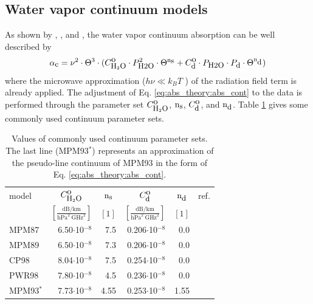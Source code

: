 \subsection{Water vapor continuum models}
\label{leveld:h2o_Cont}
As shown by \citet{liebeandlayton:87}, \citet{pwr:98}, and \citet{ma:90},
the water vapor continuum absorption can be well described by 
\begin{equation} 
  \label{eq:abs_theory:abs_cont}
  \alphac = \nu^2 \cdot \Theta^{3} \cdot 
            (\cso \cdot \phzo^2 \cdot \Theta^{\xs} + 
             \cdo \cdot \phzo \cdot \pda \cdot \Theta^{\xd})  %
\end{equation}
where the microwave approximation ($h\nu\ll k_BT$ ) of the radiation field term 
is already applied. The adjustment of Eq. \ref{eq:abs_theory:abs_cont} to the data 
is performed through the parameter set $C^{\mbox{\rm o}}_{\mbox{\rm \small H}_{2}\mbox{\rm \small O}}$, ${\rm n}_{\mbox{\rm \small s}}$, $C^{\mbox{\rm o}}_{\mbox{\rm \small d}}$, and ${\rm n}_{\mbox{\rm \small d}}$. 
Table \ref{tab:wvcontparam} gives some commonly used continuum parameter sets.
\begin{table}[!hbt]
  \begin{center}
  \begin{tabular}{lrrrrr}
    \hline
    model  & \multicolumn{1}{c}{$C^{\mbox{\rm o}}_{\mbox{\rm \small H}_{2}\mbox{\rm \small O}}$} & 
             \multicolumn{1}{c}{${\rm n}_{\mbox{\rm \small s}}$}  & 
             \multicolumn{1}{c}{$C^{\mbox{\rm o}}_{\mbox{\rm \small d}}$} & 
             \multicolumn{1}{c}{${\rm n}_{\mbox{\rm \small d}}$}  & 
             ref.\\
           & \multicolumn{1}{c}{$\left[\frac{\mbox{dB/km}}
                               {\mbox{hPa}^2~\mbox{GHz}^2}\right]$} & 
             \multicolumn{1}{c}{$[1]$} & 
             \multicolumn{1}{c}{$\left[\frac{\mbox{dB/km}}
                               {\mbox{hPa}^2~\mbox{GHz}^2}\right]$} & 
             \multicolumn{1}{c}{$[1]$} & \\
    \hline
    MPM87  & 6.50$\cdot$10$^{-8}$ & 7.5 & 0.206$\cdot$10$^{-8}$  &  0.0 & \citet{liebeandlayton:87}\\
    MPM89  & 6.50$\cdot$10$^{-8}$ & 7.3 & 0.206$\cdot$10$^{-8}$  &  0.0 & \citet{liebe:89}\\
    CP98   & 8.04$\cdot$10$^{-8}$ & 7.5 & 0.254$\cdot$10$^{-8}$  &  0.0 & \citet{cruzpol:98}\\ 
    PWR98  & 7.80$\cdot$10$^{-8}$ & 4.5 & 0.236$\cdot$10$^{-8}$  &  0.0 & \citet{pwr:98}\\
    \hline
    MPM93$^*$ & 7.73$\cdot$10$^{-8}$ & 4.55 & 0.253$\cdot$10$^{-8}$  & 1.55 & \citet{liebeetal:93}\\
    \hline
 \end{tabular}
\end{center}
 \caption[Liebe-type continuum model parameters.]{Values of commonly used continuum parameter sets. The last line (MPM93$^*$)
   represents an approximation of the pseudo-line continuum of MPM93
   in the form of Eq. \ref{eq:abs_theory:abs_cont}.}
 \label{tab:wvcontparam}
\end{table}

